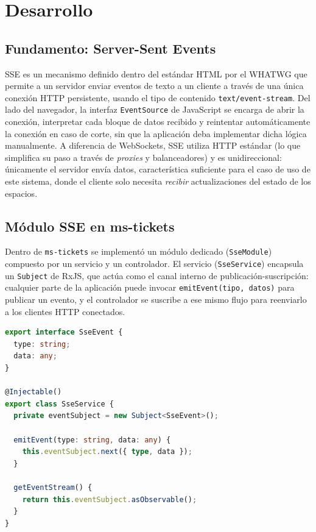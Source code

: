 \documentclass[12pt,letterpaper]{article}
\begin{document}
\newpage

\section{Desarrollo}

\subsection{Fundamento: Server-Sent Events}

SSE es un mecanismo definido dentro del estándar HTML por el WHATWG que permite a un servidor enviar eventos de texto a un cliente a través de una única conexión HTTP persistente, usando el tipo de contenido \texttt{text/event-stream}. Del lado del navegador, la interfaz \texttt{EventSource} de JavaScript se encarga de abrir la conexión, interpretar cada bloque de datos recibido y reintentar automáticamente la conexión en caso de corte, sin que la aplicación deba implementar dicha lógica manualmente. A diferencia de WebSockets, SSE utiliza HTTP estándar (lo que simplifica su paso a través de \emph{proxies} y balanceadores) y es unidireccional: únicamente el servidor envía datos, característica suficiente para el caso de uso de este sistema, donde el cliente solo necesita \emph{recibir} actualizaciones del estado de los espacios.

\subsection{Módulo SSE en ms-tickets}

Dentro de \texttt{ms-tickets} se implementó un módulo dedicado (\texttt{SseModule}) compuesto por un servicio y un controlador. El servicio (\texttt{SseService}) encapsula un \texttt{Subject} de RxJS, que actúa como el canal interno de publicación-suscripción: cualquier parte de la aplicación puede invocar \texttt{emitEvent(tipo, datos)} para publicar un evento, y el controlador se suscribe a ese mismo flujo para reenviarlo a los clientes HTTP conectados.

\begin{lstlisting}[language=TypeScript,caption={Servicio SSE basado en un Subject de RxJS (sse.service.ts)}]
export interface SseEvent {
  type: string;
  data: any;
}

@Injectable()
export class SseService {
  private eventSubject = new Subject<SseEvent>();

  emitEvent(type: string, data: any) {
    this.eventSubject.next({ type, data });
  }

  getEventStream() {
    return this.eventSubject.asObservable();
  }
}
\end{lstlisting}
\end{document}

